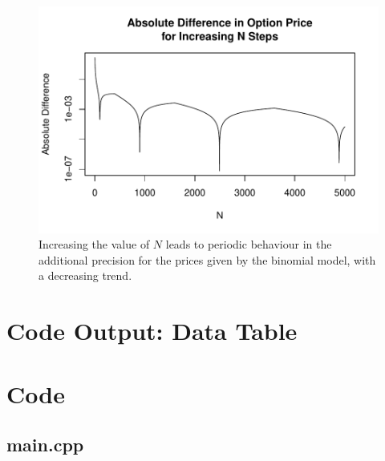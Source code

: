 \documentclass[12pt]{article}
\makeatletter
\let\oldappendix\appendix %
\renewcommand\appendix{%
    \oldappendix
    \newcommand{\section@cntformat}{\appendixname~\thesection\quad}
}
\makeatother
\begin{document}
\begin{figure}[H]
	\centering
 	\includegraphics[scale=0.52]{../plots/price_conv_diff.pdf}
\caption{\footnotesize Increasing the value of $N$ leads to periodic behaviour in the additional precision for the prices given by the binomial model, with a decreasing trend.}
\end{figure}

\newpage
\appendix
\section{Code Output: Data Table}\label{sec:data}

{\small
{}
}
\newpage
\section{Code}\label{sec:code}
\subsection{main.cpp}

\end{document}
